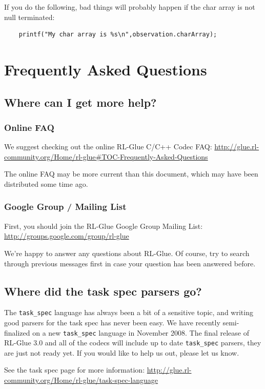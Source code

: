 \documentclass[11pt]{article}
\begin{document}
If you do the following, bad things will probably happen if the char array is not null terminated:
\begin{verbatim}
	printf("My char array is %s\n",observation.charArray);
\end{verbatim}

\section{Frequently Asked Questions}
\label{faq}
\subsection{Where can I get more help?}
\subsubsection{Online FAQ}
We suggest checking out the online RL-Glue C/C++ Codec FAQ:\newline
\url{http://glue.rl-community.org/Home/rl-glue#TOC-Frequently-Asked-Questions}

The online FAQ may be more current than this document, which may have been distributed some time ago.

\subsubsection{Google Group / Mailing List}
First, you should join the RL-Glue Google Group Mailing List:\newline
\url{http://groups.google.com/group/rl-glue}

We're happy to answer any questions about RL-Glue.  Of course, try to search through previous messages first in case your question has been answered before.

\subsection{Where did the task spec parsers go?}
The \texttt{task\_spec} language has always been a bit of a sensitive topic, and writing good parsers for the task spec has never been easy. We have recently semi-finalized on a new \texttt{task\_spec} language in November 2008.  The final release of RL-Glue 3.0 and all of the codecs will include up to date \texttt{task\_spec} parsers, they are just not ready yet.  If you would like to help us out, please let us know.

See the task spec page for more information:\newline
\url{http://glue.rl-community.org/Home/rl-glue/task-spec-language}
\end{document}

